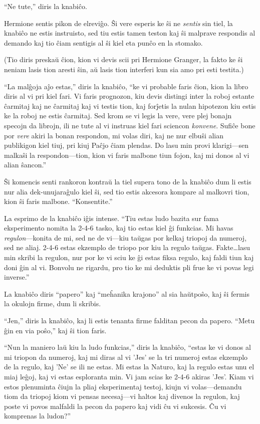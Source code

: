 ``Ne tute,'' diris la knabiĉo.

Hermione sentis pikon de elreviĝo. Ŝi vere esperis ke ŝi ne
\emph{sentis} sin tiel, la knabiĉo ne estis instruisto, sed tiu estis
tamen teston kaj ŝi malprave respondis al demando kaj tio ĉiam
sentigis al ŝi kiel eta punĉo en la stomako.

(Tio diris preskaŭ ĉion, kion vi devis scii pri Hermione Granger, la
fakto ke ŝi neniam lasis tion aresti ŝin, aŭ lasis tion interferi kun
sia amo pri esti testita.)

``La malĝoja aĵo estas,'' diris la knabiĉo, ``ke vi probable faris
ĉion, kion la libro diris al vi pri kiel fari. Vi faris prognozon, kiu
devis distingi inter la roboj estante ĉarmitaj kaj ne ĉarmitaj kaj vi
testis tion, kaj forĵetis la nulan hipotezon kiu estis ke la roboj ne
estis ĉarmitaj. Sed krom se vi legis la vere, vere plej bonajn specojn
da librojn, ili ne tute al vi instruas kiel fari sciencon
\emph{konvene}. Sufiĉe bone por \emph{vere} akiri la bonan respondon,
mi volas diri, kaj ne nur elbuŝi alian publikigon kiel tiuj, pri kiuj
Paĉjo ĉiam plendas. Do lasu min provi klarigi—sen malkaŝi la
respondon—tion, kion vi faris malbone tiun fojon, kaj mi donos al vi
alian ŝancon.''

Ŝi komencis senti rankoron kontraŭ la tiel supera tono de la knabiĉo
dum li estis nur alia dek-unujaraĝulo kiel ŝi, sed tio estis akcesora
kompare al malkovri tion, kion ŝi faris malbone. ``Konsentite.''

La esprimo de la knabiĉo iĝis intense. ``Tiu estas ludo bazita sur
fama eksperimento nomita la 2-4-6 tasko, kaj tio estas kiel ĝi
funkcias. Mi havas \emph{regulon}—konita de mi, sed ne de vi—kiu
taŭgas por kelkaj triopoj da numeroj, sed ne aliaj. 2-4-6 estas
ekzemplo de triopo por kiu la regulo taŭgas. Fakte\ldots lasu min
skribi la regulon, nur por ke vi sciu ke ĝi estas fiksa regulo, kaj
faldi tiun kaj doni ĝin al vi. Bonvolu ne rigardu, pro tio ke mi
deduktis pli frue ke vi povas legi inverse.''

La knabiĉo diris ``papero'' kaj ``meĥanika krajono'' al sia haŭtpoŝo,
kaj ŝi fermis la okulojn firme, dum li skribis.

``Jen,'' diris la knabiĉo, kaj li estis tenanta firme falditan pecon
da papero. ``Metu ĝin en via poŝo,'' kaj ŝi tion faris.

``Nun la maniero laŭ kiu la ludo funkcias,'' diris la knabiĉo, ``estas
ke vi donos al mi triopon da numeroj, kaj mi diras al vi 'Jes' se la
tri numeroj estas ekzemplo de la regulo, kaj 'Ne' se ili ne estas. Mi
estas la Naturo, kaj la regulo estas unu el miaj leĝoj, kaj vi estas
esploranta min. Vi jam scias ke 2-4-6 akiras 'Jes'. Kiam vi estos
plenuminta ĉiujn la pliaj eksperimentaj testoj, kiujn vi volas—demandu
tiom da triopoj kiom vi pensas necesaj—vi haltos kaj divenos la
regulon, kaj poste vi povos malfaldi la pecon da papero kaj vidi ĉu vi
sukcesis. Ĉu vi komprenas la ludon?''

